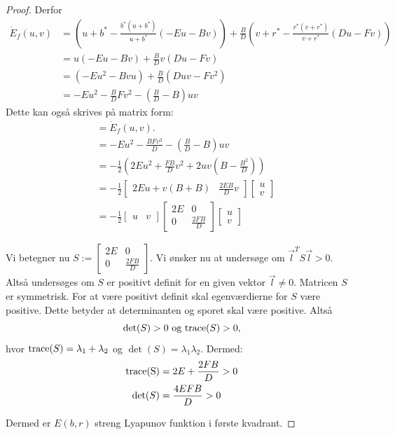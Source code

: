 \begin{proof}
Derfor
\begin{align*}
    \dot{E}_f(u, v) &= \left( u + b^* - \frac{b^*(u+b^*)}{u+b^*} (-Eu-Bv) \right) + \frac{B}{D} \left( v + r^* - \frac{r^*(v+r^*)}{v+r^*} (Du-Fv) \right) \\
    &= u(-Eu-Bv) + \frac{B}{D} v(Du-Fv) \\
    &= (-Eu^2-Bvu) + \frac{B}{D} (Duv-Fv^2) \\
    &= - Eu^2- \frac{B}{D}  Fv^2 -(\frac{B}{D} - B)uv
\end{align*}
Dette kan også skrives på matrix form:
\begin{align*} 
&= \dot{E}_f(u,v). \\
&= -  Eu^2- \frac{BFv^2}{D}-(\frac{B}{D} - B)uv \\
&= - \frac{1}{2} (2E u^2 + \frac{FB}{D} v^2 + 2 uv(B - \frac{B^2}{D})) \\
&= - \frac{1}{2} \begin{bmatrix}
2E u + v(B + B) & \frac{2EB}{D} v 
\end{bmatrix}
\begin{bmatrix}
u \\
v
\end{bmatrix}\\
&= - \frac{1}{2} \begin{bmatrix}
u & v
\end{bmatrix} 
\begin{bmatrix}
2E & 0 \\
0 & \frac{2FB}{D}
\end{bmatrix}
\begin{bmatrix}
u \\
v
\end{bmatrix} 
\end{align*}

Vi betegner nu $S:= \begin{bmatrix}
2E & 0\\
0 & \frac{2FB}{D}
\end{bmatrix}$. Vi ønsker nu at undersøge om $\vec{l}^T S \vec{l} > 0$. Altså undersøges om $S$ er positivt definit for en given vektor $\vec{l} \neq 0$.
Matricen $S$ er symmetrisk. For at være positivt definit skal egenværdierne for $S$ være positive. Dette betyder at determinanten og sporet skal være positive. 
Altså $$\det (S) > 0 \ \textnormal{og} \ \textnormal{trace} (S) > 0,$$ hvor $\textnormal{trace}(S)=\lambda_1 + \lambda_2$ og $\det(S)=\lambda_1\lambda_2$. Dermed: 
\begin{align*}
    \textnormal{trace(S)} &=2E + \frac{2FB}{D}> 0\\
    \det(S) &=\frac{4EFB}{D} >0 \\
\end{align*}

Dermed er $E(b,r)$ streng Lyapunov funktion i første kvadrant.

\end{proof}\\ \hfill \break